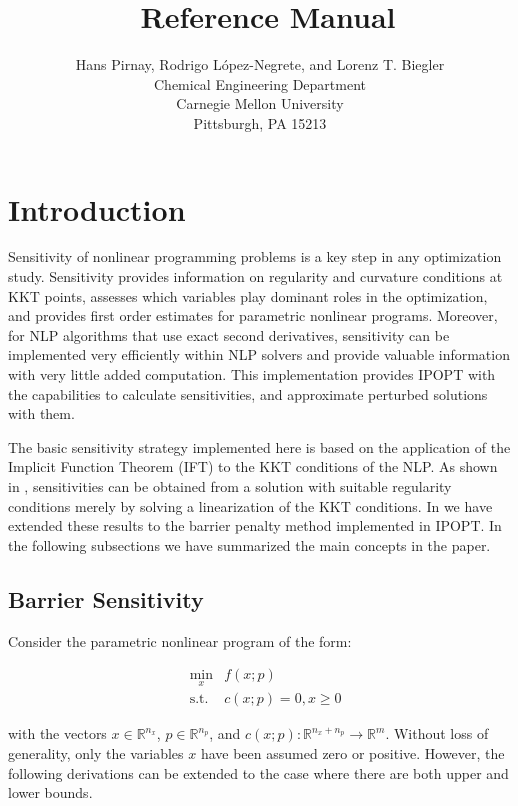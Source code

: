 \documentclass[letter, 11pt]{article}
\title{ \sensKKT\ Reference Manual}
\author{Hans Pirnay, Rodrigo L\'opez-Negrete, and
        Lorenz T. Biegler \\
Chemical Engineering Department \\
Carnegie Mellon University \\
Pittsburgh, PA 15213}
\begin{document}
\maketitle
\tableofcontents

\section{Introduction}
\onehalfspacing

Sensitivity of nonlinear programming problems is a key
step in any optimization study. Sensitivity provides
information on regularity and curvature conditions at KKT points,
assesses which variables play dominant roles in the optimization, and
provides first order estimates for parametric nonlinear programs.
Moreover, for NLP algorithms that use exact second derivatives,
sensitivity can be implemented very efficiently within NLP solvers and
provide valuable information with very little added computation. This
implementation provides IPOPT with the capabilities to calculate
sensitivities, and approximate perturbed solutions with them.

The basic sensitivity strategy implemented here is based on the
application of the Implicit Function Theorem (IFT) to the KKT conditions
of the NLP. As shown in \citet{Fiacco1983},
sensitivities can be obtained from a solution with suitable regularity
conditions merely by solving a linearization of the KKT
conditions. In \citet{pirnay:2011} we have extended these results to
the barrier penalty method implemented in IPOPT. In the following subsections
we have summarized the main concepts in the paper.

\subsection{Barrier Sensitivity} \label{sec:barrier}

Consider the parametric nonlinear program of the form:

\begin{subequations} \label{NLPsens}
 \begin{eqnarray}
  &\min_x & f(x; p) \\
  &\mbox{s.t.} & c(x; p) = 0, x \geq 0
 \end{eqnarray}
\end{subequations}

\noindent with the vectors $x \in \mathbb{R}^{n_x}$, $p \in \mathbb{R}^{n_p}$,
and $c(x; p): \mathbb{R}^{n_x+n_p} \to \mathbb{R}^{m}$. Without loss of generality,
only the variables $x$ have been assumed zero or positive. However,
the following derivations can be extended to the case where there are both
upper and lower bounds.
\end{document}
